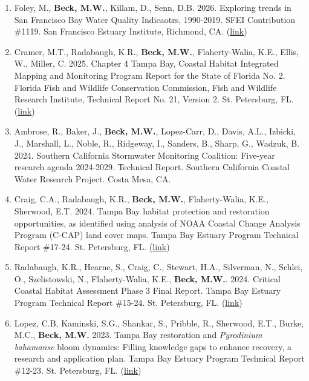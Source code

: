 \documentclass[letterpaper,12pt]{article}
\begin{document}
\begin{enumerate}

\item Foley, M., \textbf{Beck, M.W.}, Killam, D., Senn, D.B. 2026. Exploring trends in San Francisco Bay Water Quality Indicaotrs, 1990-2019. SFEI Contribution \#1119. San Francisco Estuary Institute, Richmond, CA. ({\footnotesize\href{https://www.sfei.org/sites/default/files/biblio/2026-10/Exploring_Trends_SF_Bay_WQ_Oct26_final.pdf}{link}})

\item Cramer, M.T., Radabaugh, K.R., \textbf{Beck, M.W.}, Flaherty-Walia, K.E., Ellis, W., Miller, C. 2025. Chapter 4 Tampa Bay, Coastal Habitat Integrated Mapping and Monitoring Program Report for the State of Florida No. 2. Florida Fish and Wildlife Conservation Commission, Fish and Wildlife Research Institute, Technical Report No. 21, Version 2. St. Petersburg, FL. ({\footnotesize\href{https://myfwc.com/media/iotl3mpa/chimmp-v2-ch04.pdf}{link}})

\item Ambrose, R., Baker, J., \textbf{Beck, M.W.}, Lopez-Carr, D., Davis, A.L., Izbicki, J., Marshall, L., Noble, R., Ridgeway, I., Sanders, B., Sharp, G., Wadzuk, B. 2024. Southern California Stormwater Monitoring Coalition: Five-year research agenda 2024-2029.  Technical Report. Southern California Coastal Water Research Project. Costa Mesa, CA.

\item Craig, C.A., Radabaugh, K.R., \textbf{Beck, M.W.}, Flaherty-Walia, K.E., Sherwood, E.T. 2024. Tampa Bay habitat protection and restoration opportunities, as identified using analysis of NOAA Coastal Change Analysis Program (C-CAP) land cover maps. Tampa Bay Estuary Program Technical Report \#17-24. St. Petersburg, FL. ({\footnotesize\href{https://drive.google.com/file/d/1gllsxxPoFx7X59dV91yyWgUD9SF99chn/view}{link}})

\item Radabaugh, K.R., Hearne, S., Craig, C., Stewart, H.A., Silverman, N., Schlei, O., Szelistowski, N., Flaherty-Walia, K.E., \textbf{Beck, M.W.}. 2024. Critical Coastal Habitat Assessment Phase 3 Final Report. Tampa Bay Estuary Program Technical Report \#15-24. St. Petersburg, FL. ({\footnotesize\href{https://drive.google.com/file/d/1BKVVK-1eGyUQ_Jg5t0yhZgtPa5a8-roh/view}{link}})

\item Lopez, C.B, Kaminski, S.G., Shankar, S., Pribble, R., Sherwood, E.T., Burke, M.C., \textbf{Beck, M.W.} 2023. Tampa Bay restoration and \textit{Pyrodinium bahamanse} bloom dynamics: Filling knowledge gaps to enhance recovery, a research and application plan. Tampa Bay Estuary Program Technical Report \#12-23. St. Petersburg, FL. ({\footnotesize\href{https://drive.google.com/file/d/140oBnV5R2BwOZ7cMuaY-4bu_ftL-YBVJ/view?usp=sharing}{link}})


\end{enumerate}
\end{document}

